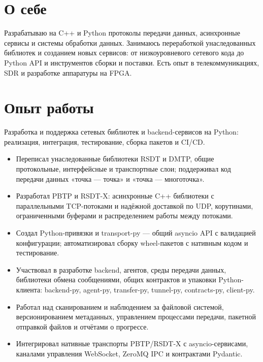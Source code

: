 \documentclass[10pt,a4paper]{article}
\begin{document}

\section*{О себе}
Разрабатываю на C++ и Python протоколы передачи данных, асинхронные сервисы
и системы обработки данных. Занимаюсь переработкой унаследованных библиотек
и созданием новых сервисов: от низкоуровневого сетевого кода до Python API
и инструментов сборки и поставки. Есть опыт в телекоммуникациях, SDR и
разработке аппаратуры на FPGA.

\section*{Опыт работы}
Разработка и поддержка сетевых библиотек и backend-сервисов на Python:
реализация, интеграция, тестирование, сборка пакетов и CI/CD.

\begin{itemize}
  \item Переписал унаследованные библиотеки RSDT и DMTP, общие протокольные,
    интерфейсные и транспортные слои; поддерживал код передачи данных
    «точка — точка» и «точка — многоточка».
  \item Разработал PBTP и RSDT-X: асинхронные C++ библиотеки с параллельными
    TCP-потоками и надёжной доставкой по UDP, корутинами, ограниченными
    буферами и распределением работы между потоками.
  \item Создал Python-привязки и transport-py — общий asyncio API
    с валидацией конфигурации; автоматизировал сборку wheel-пакетов
    с нативным кодом и тестирование.
\end{itemize}

\begin{itemize}
  \item Участвовал в разработке backend, агентов, среды передачи данных,
    библиотеки обмена сообщениями, общих контрактов и упаковки Python-клиента:
    backend-py, agent-py, transfer-py, tunnel-py, contracts-py, client-py.
  \item Работал над сканированием и наблюдением за файловой системой,
    версионированием метаданных, управлением процессами передачи,
    пакетной отправкой файлов и отчётами о прогрессе.
  \item Интегрировал нативные транспорты PBTP/RSDT-X с asyncio-сервисами,
    каналами управления WebSocket, ZeroMQ IPC и контрактами Pydantic.
\end{itemize}
\end{document}
